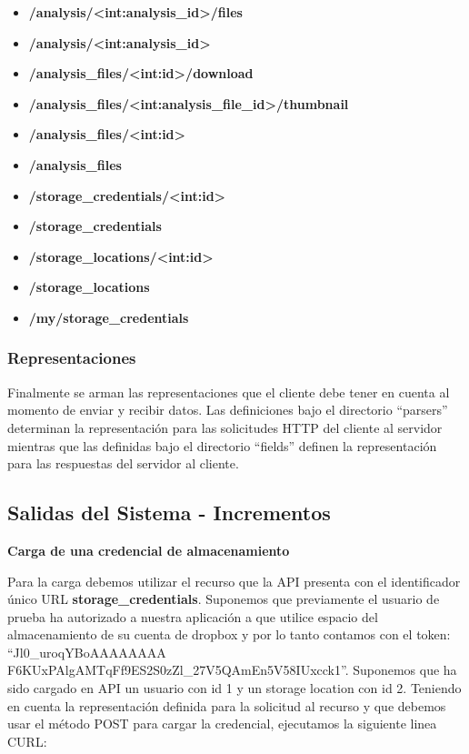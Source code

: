 \documentclass[a4paper,12pt]{article}
\begin{document}
\begin{itemize}
	\item\textbf{/analysis/<int:analysis\_id>/files}
	\item\textbf{/analysis/<int:analysis\_id>}
	\item\textbf{/analysis\_files/<int:id>/download}
	\item\textbf{/analysis\_files/<int:analysis\_file\_id>/thumbnail}
	\item\textbf{/analysis\_files/<int:id>}
	\item\textbf{/analysis\_files}
	\item\textbf{/storage\_credentials/<int:id>}
	\item\textbf{/storage\_credentials}
	\item\textbf{/storage\_locations/<int:id>}
	\item\textbf{/storage\_locations}
	\item\textbf{/my/storage\_credentials}
\end{itemize}

\subsubsection{Representaciones}
Finalmente se arman las representaciones que el cliente debe tener en cuenta al momento de enviar y recibir datos. Las definiciones bajo el directorio ``parsers'' determinan la representación para las solicitudes HTTP del cliente al servidor mientras que las definidas bajo el directorio ``fields'' definen la representación para las respuestas del servidor al cliente.





\subsection {Salidas del Sistema - Incrementos}
\textbf{Carga de una credencial de almacenamiento}

Para la carga debemos utilizar el recurso que la API presenta con el identificador único URL \textbf{\/storage\_credentials}. Suponemos que previamente el usuario de prueba ha autorizado a nuestra aplicación a que utilice espacio del almacenamiento de su cuenta de dropbox y por lo tanto contamos con el token: ``Jl0\_uroqYBoAAAAAAAA
F6KUxPAlgAMTqFf9ES2S0zZl\_27V5QAmEn5V58IUxcck1''. Suponemos que ha sido cargado en API un usuario con id 1 y un storage location con id 2. Teniendo en cuenta la representación definida para la solicitud al recurso y que debemos usar el método POST para cargar la credencial, ejecutamos la siguiente linea CURL:
\end{document}
